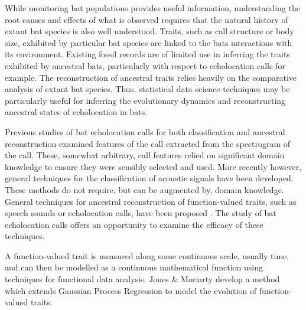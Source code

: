 \documentclass[wsdraft]{ws-rv9x6} %
\begin{document}
While monitoring bat populations provides useful information, understanding the root causes and effects of what is observed requires that the natural history of extant bat species is also well understood. Traits, such as call structure or body size, exhibited by particular bat species are linked to the bats interactions with its environment. \cite{aldridge1987morphology} Existing fossil records are of limited use in inferring the traits exhibited by ancestral bats, particularly with respect to echolocation calls for example. The reconstruction of ancestral traits relies heavily on the comparative analysis\cite{felsenstein2004inferring} of extant bat species. Thus, statistical data science techniques may be particularly useful for inferring the evolutionary dynamics and reconstructing ancestral states of echolocation in bats.

Previous studies of bat echolocation calls for both classification \cite{walters2012continental} and ancestral reconstruction \cite{collen2012evolution} examined features of the call extracted from the spectrogram of the call. These, somewhat arbitrary, call features relied on significant domain knowledge to ensure they were sensibly selected and used. More recently however, general techniques for the classification of acoustic signals have been developed. \cite{stathopoulos2014bat} \cite{damoulas2010bayesian} These methods do not require, but can be augmented by, domain knowledge. General techniques for ancestral reconstruction of function-valued traits, such as speech sounds or echolocation calls, have been proposed \cite{group2012phylogenetic}. The study of bat echolocation calls offers an opportunity to examine the efficacy of these techniques.

A function-valued trait is measured along some continuous scale, usually time, and can then be modelled as a continuous mathematical function using techniques for functional data analysis. \cite{ramsay2006functional} Jones \& Moriarty \cite{jones2013evolutionary} develop a method which extends Gaussian Process Regression \cite{rasmussen2006gaussian} to model the evolution of function-valued traits. 






\end{document}
